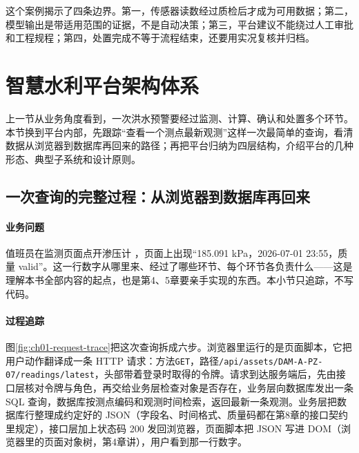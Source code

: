 这个案例揭示了四条边界。第一，传感器读数经过质检后才成为可用数据；第二，模型输出是带适用范围的证据，不是自动决策；第三，平台建议不能绕过人工审批和工程规程；第四，处置完成不等于流程结束，还要用实况复核并归档。

\section{智慧水利平台架构体系}

上一节从业务角度看到，一次洪水预警要经过监测、计算、确认和处置多个环节。本节换到平台内部，先跟踪“查看一个测点最新观测”这样一次最简单的查询，看清数据从浏览器到数据库再回来的路径；再把平台归纳为四层结构，介绍平台的几种形态、典型子系统和设计原则。

\subsection{一次查询的完整过程：从浏览器到数据库再回来}

\paragraph{业务问题}值班员在监测页面点开渗压计 \cpKeyStation，页面上出现“185.091 kPa，2026-07-01 23:55，质量 valid”。这一行数字从哪里来、经过了哪些环节、每个环节各负责什么——这是理解本书全部内容的起点，也是第4、5章要亲手实现的东西。本小节只追踪，不写代码。

\paragraph{过程追踪}图\ref{fig:ch01-request-trace}把这次查询拆成六步。浏览器里运行的是页面脚本，它把用户动作翻译成一条 HTTP 请求：方法\texttt{GET}，路径\texttt{/api/assets/DAM-A-PZ-07/readings/latest}，头部带着登录时取得的令牌。请求到达服务端后，先由接口层核对令牌与角色，再交给业务层检查对象是否存在，业务层向数据库发出一条 SQL 查询，数据库按测点编码和观测时间检索，返回最新一条观测。业务层把数据库行整理成约定好的 JSON（字段名、时间格式、质量码都在第8章的接口契约里规定），接口层加上状态码 200 发回浏览器，页面脚本把 JSON 写进 DOM（浏览器里的页面对象树，第4章讲），用户看到那一行数字。

